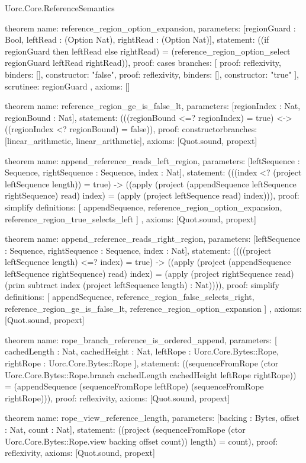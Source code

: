 \begin{lexlean}{Uorc.Core.ReferenceSemantics}
\begin{semanticmodule}
theorem{
  name: reference_region_option_expansion,
  parameters: [regionGuard : Bool, leftRead : (Option Nat), rightRead : (Option Nat)],
  statement: ((if regionGuard then leftRead else rightRead) = (reference_region_option_select regionGuard leftRead rightRead)),
  proof: cases{
    branches: [
      {proof: reflexivity{}, binders: [], constructor: "false"},
      {proof: reflexivity{}, binders: [], constructor: "true"}
    ],
    scrutinee: regionGuard
  },
  axioms: []
}

theorem{
  name: reference_region_ge_is_false_lt,
  parameters: [regionIndex : Nat, regionBound : Nat],
  statement: (((regionBound <=? regionIndex) = true) <-> ((regionIndex <? regionBound) = false)),
  proof: constructor{branches: [linear_arithmetic{}, linear_arithmetic{}]},
  axioms: [Quot.sound, propext]
}

theorem{
  name: append_reference_reads_left_region,
  parameters: [leftSequence : Sequence, rightSequence : Sequence, index : Nat],
  statement: (((index <? (project leftSequence length)) = true) -> ((apply (project (appendSequence leftSequence rightSequence) read) index) = (apply (project leftSequence read) index))),
  proof: simplify{
    definitions: [
      appendSequence,
      reference_region_option_expansion,
      reference_region_true_selects_left
    ]
  },
  axioms: [Quot.sound, propext]
}

theorem{
  name: append_reference_reads_right_region,
  parameters: [leftSequence : Sequence, rightSequence : Sequence, index : Nat],
  statement: ((((project leftSequence length) <=? index) = true) -> ((apply (project (appendSequence leftSequence rightSequence) read) index) = (apply (project rightSequence read) (prim subtract index (project leftSequence length) : Nat)))),
  proof: simplify{
    definitions: [
      appendSequence,
      reference_region_false_selects_right,
      reference_region_ge_is_false_lt,
      reference_region_option_expansion
    ]
  },
  axioms: [Quot.sound, propext]
}

theorem{
  name: rope_branch_reference_is_ordered_append,
  parameters: [
    cachedLength : Nat,
    cachedHeight : Nat,
    leftRope : Uorc.Core.Bytes::Rope,
    rightRope : Uorc.Core.Bytes::Rope
  ],
  statement: ((sequenceFromRope (ctor Uorc.Core.Bytes::Rope.branch cachedLength cachedHeight leftRope rightRope)) = (appendSequence (sequenceFromRope leftRope) (sequenceFromRope rightRope))),
  proof: reflexivity{},
  axioms: [Quot.sound, propext]
}

theorem{
  name: rope_view_reference_length,
  parameters: [backing : Bytes, offset : Nat, count : Nat],
  statement: ((project (sequenceFromRope (ctor Uorc.Core.Bytes::Rope.view backing offset count)) length) = count),
  proof: reflexivity{},
  axioms: [Quot.sound, propext]
}


\end{semanticmodule}
\end{lexlean}
